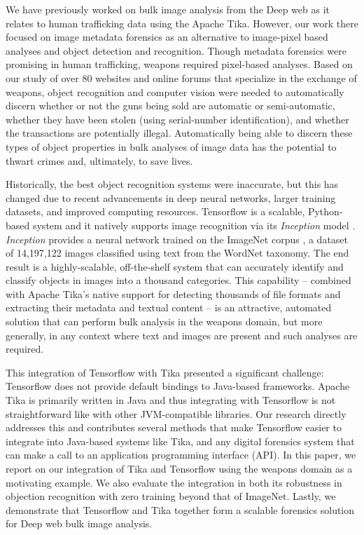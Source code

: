 We have previously worked on bulk image analysis from the Deep web as it relates to human trafficking data \cite{mattmann7tg} using the Apache Tika. However, our work there focused on image metadata forensics as an alternative to image-pixel based analyses and object detection and recognition. Though metadata forensics were promising in human trafficking, weapons required pixel-based analyses. Based on our study of over 80 websites and online forums that specialize in the exchange of weapons, object recognition and computer vision were needed to automatically discern whether or not the guns being sold are automatic or semi-automatic, whether they have been stolen (using serial-number identification), and whether the transactions are potentially illegal. Automatically being able to discern these types of object properties in bulk analyses of image data has the potential to thwart crimes and, ultimately, to save lives.

Historically, the best object recognition systems were inaccurate, but this has changed due to recent advancements in deep neural networks, larger training datasets, and improved computing resources. Tensorflow is a scalable, Python-based system and it natively supports image recognition via its \textit{Inception} model \cite{abadi2016tensorflow}. \textit{Inception} provides a neural network trained on the ImageNet corpus \cite{krizhevsky2012imagenet}, a dataset of 14,197,122 images classified using text from the WordNet taxonomy. The end result is a highly-scalable, off-the-shelf system that can accurately identify and classify objects in images into a thousand categories. This capability -- combined with Apache Tika's native support for detecting thousands of file formats and extracting their metadata and textual content -- is an attractive, automated solution that can perform bulk analysis in the weapons domain, but more generally, in any context where text and images are present and such analyses are required.

This integration of Tensorflow with Tika presented a significant challenge: Tensorflow does not provide default bindings to Java-based frameworks. Apache Tika is primarily written in Java and thus integrating with Tensorflow is not straightforward like with other JVM-compatible libraries. Our research directly addresses this and contributes several methods that make Tensorflow easier to integrate into Java-based systems like Tika, and any digital forensics system that can make a call to an application programming interface (API). In this paper, we report on our integration of Tika and Tensorflow using the weapons domain as a motivating example. We also evaluate the integration in both its robustness in objection recognition with zero training beyond that of ImageNet. Lastly, we demonstrate that Tensorflow and Tika together form  a scalable forensics solution for Deep web bulk image analysis.

